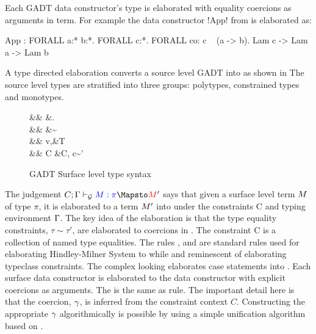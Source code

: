 \documentclass[manuscript,screen,nonacm]{acmart}
\begin{document}
Each GADT data constructor's type is elaborated with equality coercions as arguments in \SFC term.
For example the data constructor !App! from  is elaborated as:
\begin{code}
  App : FORALL a:* b:*. FORALL c:*. FORALL co: c ~ (a -> b). Lam c -> Lam a -> Lam b
\end{code}
A type directed elaboration converts a source level GADT into \SFC as shown in 
The source level types are stratified into three groups: polytypes, constrained types and monotypes.
\begin{figure}[ht]
  \centering
  \begin{syntax}
             && \pi   &\bnfeq \eta \bnfor \Forall\alpha.\pi\\
     && \eta  &\bnfeq \tau \bnfor \tau\sim\tau \then \eta\\
             && v,\tau  &\bnfeq \alpha \bnfor \tau\to\tau \bnfor T\App\many\tau\\
           && C     &\bnfeq \empt \bnfor C, c\co\tau\sim\tau'
  \end{syntax}
  \caption{GADT Surface level type syntax}
  \label{fig:gadt-type-syntax}
\end{figure}
The judgement $\GTranslate C \TEnv \Tm \pi \Tm'$ says that given a surface level term $M$ of type $\pi$, it is elaborated to a term $M'$ into \SFC under the constraints C and typing environment $\Gamma$. The key idea of the elaboration is that the type equality constraints, $\tau\sim\tau'$, are elaborated to coercions in \SFC. The constraint C is a collection of named type equalities. The rules ,  and  are standard rules used for elaborating Hindley-Milner System to \SF while  and  reminescent of elaborating typeclass constraints. The complex looking  elaborates case statements into \SFC. Each surface data constructor is elaborated to the \SFC data constructor with explicit coercions as arguments. The  is the same as  rule. The important detail here is that the coercion, $\gamma$, is inferred from the constraint context $C$. Constructing the appropriate $\gamma$ algorithmically is possible by using a simple unification algorithm based on \cite{lassez_unification_1988}.
\end{document}

